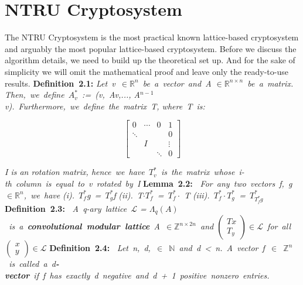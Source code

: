\newpage
\section{NTRU Cryptosystem}
\label{chapter2}
\textit{}

The NTRU Cryptosystem is the most practical known lattice-based cryptosystem and arguably the most popular lattice-based cryptosystem. Before we discuss the algorithm details, we need to build up the theoretical set up. And for the sake of simplicity we will omit the mathematical proof and leave only the ready-to-use results. 
\newline
\newline
\textbf{Definition\ 2.1: }  \emph{Let\ v\ $\in \mathbb{R}^n$\ be\ a\ vector\ and\ A $\in \mathbb{R}^{n\times n}$\ be\ a\ matrix. Then,\ we\ define\ $A^*_v$\ :=\ (v,\ Av,..., A$^{n-1}$v).\ Furthermore,\ we\ define\ the\ matrix\ T, where\ T\ is: }
\begin{center}
        $$\left[\begin{array}{ccc|c}
                0 & \cdots & 0 & 1 \\ \hline
                \ddots & \ & \ & 0 \\
                \ & I & \ & \vdots \\
                \ & \ & \ddots & 0
\end{array}\right] $$
\end{center}
\emph{I is an rotation matrix, hence\ we\ have\ $T^*_v$\ is\ the\ matrix\ whose\ i-th\ column\ is\ equal\ to\ v\ rotated\ by\ I}
\newline
\newline
\textbf{Lemma\ 2.2:\ } \emph{For\ any\ two\ vectors\ f,\ g\ $\in \mathbb{R}^n$,\ we\ have}
\newline
\emph{(i).\ $T^*_f$g\ =\ $T^*_g$f}
\newline
\emph{(ii).\ T$\cdot T^*_f$\ =\ $T^*_f \cdot$ T}
\newline
\emph{(iii).\ $T^*_f\cdot T^*_g$\ =\ $T^*_{T^*_fg}$}
\newline
\newline
\textbf{Definition\ 2.3:\ } \emph{A\ q-ary\ lattice\ $\mathcal{L}$ = $\Lambda_{q}(A)$\ is\ a\ \textbf{convolutional\ modular\ lattice}\ A\ $\in \mathbb{Z}^{n \times 2 n}$\ and $\left(\begin{array}{l}{T x} \\ {T_{y}}\end{array}\right) \in \mathcal{L}$\ for\ all\ $\left(\begin{array}{l}{x} \\ {y}\end{array}\right) \in \mathcal{L}$}
\newline
\newline
\textbf{Definition\ 2.4:\ } \emph{Let\ n,\ d,\ $\in$\ $\mathbb{N}$\ and\ d\ <\ n.\ A\ vector\ f\ $\in$\ $\mathbb{Z}^n$\ is\ called\ a\ d\textbf{-vector}\ if\ f\ has\ exactly\ d\ negative\ and\ d\ +\ 1\ positive\ nonzero\ entries.}
\newline
\newline


